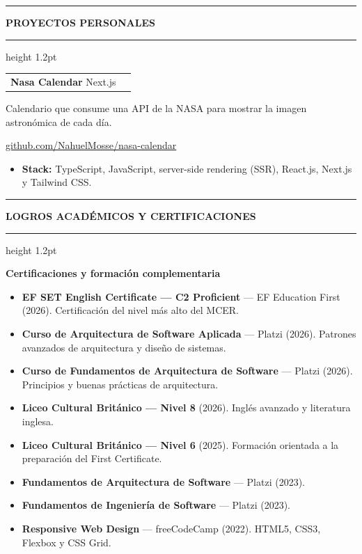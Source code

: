 \documentclass[11pt,letterpaper]{article}
\makeatletter
\newcommand{\cvsection}[1]{%
  \Needspace{4\baselineskip}%
  \vspace{0.55em}%
  \noindent
  {\color{accent}\rule[-0.18em]{3pt}{1.25em}}%
  \hspace{0.45em}%
  {\large\bfseries\color{accentdark}\MakeUppercase{#1}}%
  \hspace{0.55em}%
  {\color{accentlight}\leaders\hrule height 1.2pt\hfill\kern0pt}\par
  \vspace{0.28em}%
}
\newcommand{\cventry}[3]{%
  \begin{tabularx}{\textwidth}{@{}Xr@{}}
    \textbf{\color{accentdark}#1} \textcolor{muted}{\textbar}\enspace #2
    & \small\textcolor{muted}{#3}
  \end{tabularx}
}
\makeatother
\begin{document}
\cvsection{Proyectos personales}

\cventry{Nasa Calendar}{Next.js}{}

Calendario que consume una API de la NASA para mostrar la imagen astronómica de cada día.

\href{https://github.com/NahuelMosse/nasa-calendar}{github.com/NahuelMosse/nasa-calendar}

\begin{itemize}
  \item \textbf{Stack:} TypeScript, JavaScript, server-side rendering (SSR), React.js,
    Next.js y Tailwind CSS.
\end{itemize}

\cvsection{Logros académicos y certificaciones}

{\large\bfseries\color{accentdark}Certificaciones y formación complementaria}\par
\begin{itemize}
  \item \textbf{EF SET English Certificate --- C2 Proficient} --- EF Education First
    (2026). Certificación del nivel más alto del MCER.
  \item \textbf{Curso de Arquitectura de Software Aplicada} --- Platzi (2026).
    Patrones avanzados de arquitectura y diseño de sistemas.
  \item \textbf{Curso de Fundamentos de Arquitectura de Software} --- Platzi (2026).
    Principios y buenas prácticas de arquitectura.
  \item \textbf{Liceo Cultural Británico --- Nivel 8} (2026). Inglés avanzado y
    literatura inglesa.
  \item \textbf{Liceo Cultural Británico --- Nivel 6} (2025). Formación orientada a la
    preparación del First Certificate.
  \item \textbf{Fundamentos de Arquitectura de Software} --- Platzi (2023).
  \item \textbf{Fundamentos de Ingeniería de Software} --- Platzi (2023).
  \item \textbf{Responsive Web Design} --- freeCodeCamp (2022). HTML5, CSS3, Flexbox y
    CSS Grid.
\end{itemize}
\end{document}
